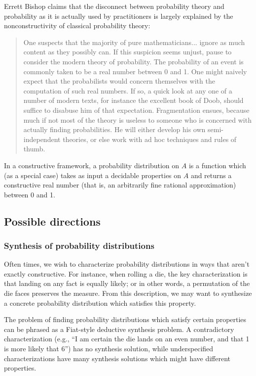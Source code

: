 \documentclass{article}           %
\begin{document}
Errett Bishop claims that the disconnect between probability theory and probability as it is actually used by practitioners is largely explained by the nonconstructivity of classical probability theory\cite{bishop1973}:

\begin{quote}
One suspects that the majority of pure mathematicians... ignore as much content as they possibly can. If this suspicion seems unjust, pause to consider the modern theory of probability. The probability of an event is commonly taken to be a real number between 0 and 1. One might naively expect that the probabilists would concern themselves with the computation of such real numbers. If so, a quick look at any one of a number of modern texts, for instance the excellent book of Doob, should suffice to disabuse him of that expectation. Fragmentation ensues, because much if not most of the theory is useless to someone who is concerned with actually finding probabilities. He will either develop his own semi-independent theories, or else work with ad hoc techniques and rules of thumb.
\end{quote}

In a constructive framework, a probability distribution on $A$ is a function which (as a special case) takes as input a decidable properties on $A$ and returns a constructive real number (that is, an arbitrarily fine rational approximation) between 0 and 1. 

\subsection{Possible directions}

\subsubsection{Synthesis of probability distributions}

Often times, we wish to characterize probability distributions in ways that aren't exactly constructive. For instance, when rolling a die, the key characterization is that landing on any fact is equally likely; or in other words, a permutation of the die faces preserves the measure. From this description, we may want to synthesize a concrete probability distribution which satisfies this property.

The problem of finding probability distributions which satisfy certain properties can be phrased as a Fiat-style deductive synthesis problem. A contradictory characterization (e.g., ``I am certain the die lands on an even number, and that 1 is more likely that 6'') has no synthesis solution, while underspecified characterizations have many synthesis solutions which might have different properties.
\end{document}
